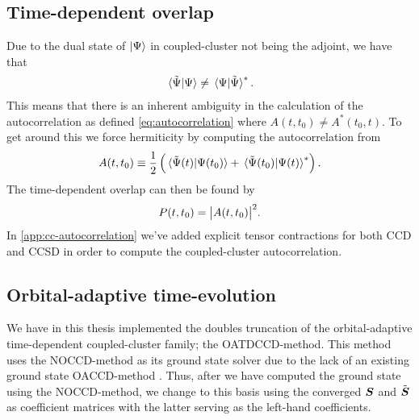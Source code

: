         \subsection{Time-dependent overlap}
            Due to the dual state of $\ket{\Psi}$ in coupled-cluster not being
            the adjoint, we have that
            \begin{align}
                \braket*{\tilde{\Psi}}{\Psi}
                \neq \braket*{\Psi}{\tilde{\Psi}}^{*}.
            \end{align}
            This means that there is an inherent ambiguity in the calculation of
            the autocorrelation as defined \autoref{eq:autocorrelation} where
            $A(t, t_0) \neq A^{*}(t_0, t)$.
            To get around this we force hermiticity by computing the
            autocorrelation from \cite{pedersen2018symplectic}
            \begin{align}
                A(t, t_0)
                \equiv \frac{1}{2}\left( 
                    \braket*{\tilde{\Psi}(t)}{\Psi(t_0)}
                    + \braket*{\tilde{\Psi}(t_0)}{\Psi(t)}^{*}
                 \right).
            \end{align}
            The time-dependent overlap can then be found by
            \begin{align}
                P(t, t_0)
                = \abs{A(t, t_0)}^2.
            \end{align}
            In \autoref{app:cc-autocorrelation} we've added explicit tensor
            contractions for both CCD and CCSD in order to compute the
            coupled-cluster autocorrelation.

        \subsection{Orbital-adaptive time-evolution}
            \label{subsec:oatdcc-implementation}
            We have in this thesis implemented the doubles truncation of the
            orbital-adaptive time-dependent coupled-cluster family; the
            OATDCCD-method.
            This method uses the NOCCD-method as its ground state solver due to
            the lack of an existing ground state OACCD-method
            \cite{kvaal2012ab}.
            Thus, after we have computed the ground state using the
            NOCCD-method, we change to this basis using the converged $\boldsymbol{S}$
            and $\tilde{\boldsymbol{S}}$ as coefficient matrices with the latter
            serving as the left-hand coefficients.


